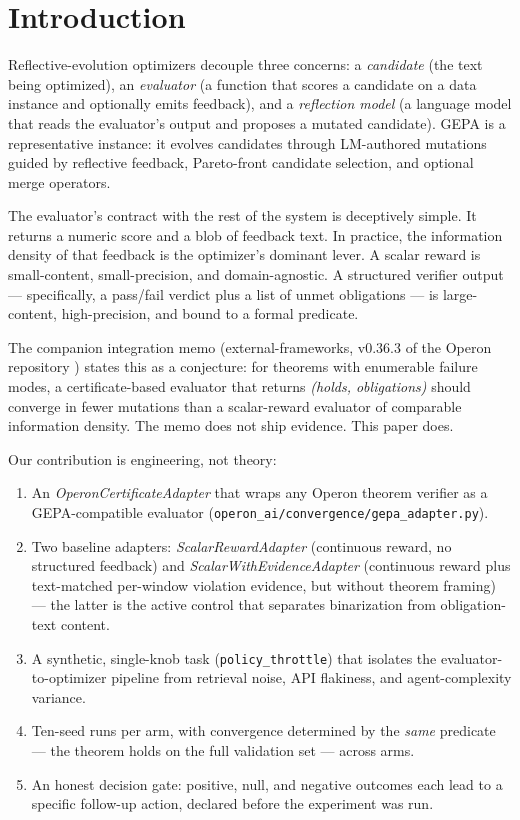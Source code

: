 \section{Introduction}\label{sec:intro}

Reflective-evolution optimizers decouple three concerns: a
\emph{candidate} (the text being optimized), an \emph{evaluator} (a
function that scores a candidate on a data instance and optionally
emits feedback), and a \emph{reflection model} (a language model that
reads the evaluator's output and proposes a mutated candidate).  GEPA
\cite{agrawal2025gepa} is a representative instance: it evolves
candidates through LM-authored mutations guided by reflective
feedback, Pareto-front candidate selection, and optional merge
operators.

The evaluator's contract with the rest of the system is deceptively
simple.  It returns a numeric score and a blob of feedback text.  In
practice, the information density of that feedback is the
optimizer's dominant lever.  A scalar reward is small-content,
small-precision, and domain-agnostic.  A structured verifier output
--- specifically, a pass/fail verdict plus a list of unmet
obligations --- is large-content, high-precision, and bound to a
formal predicate.

The companion integration memo (external-frameworks, v0.36.3 of the
Operon repository \cite{banu2026operon}) states this as a conjecture: for
theorems with enumerable failure modes, a certificate-based evaluator
that returns \emph{(holds, obligations)} should converge in fewer
mutations than a scalar-reward evaluator of comparable information
density.  The memo does not ship evidence.  This paper does.

Our contribution is engineering, not theory:

\begin{enumerate}[leftmargin=*,itemsep=2pt,topsep=2pt]
\item An \emph{OperonCertificateAdapter} that wraps any Operon
theorem verifier as a GEPA-compatible evaluator
(\texttt{operon\_ai/convergence/gepa\_adapter.py}).
\item Two baseline adapters:
\emph{ScalarRewardAdapter} (continuous reward, no structured
feedback) and \emph{ScalarWithEvidenceAdapter} (continuous reward
plus text-matched per-window violation evidence, but without theorem
framing) --- the latter is the active control that separates
binarization from obligation-text content.
\item A synthetic, single-knob task
(\texttt{policy\_throttle}) that isolates the evaluator-to-optimizer
pipeline from retrieval noise, API flakiness, and
agent-complexity variance.
\item Ten-seed runs per arm, with convergence determined by the
\emph{same} predicate --- the theorem holds on the full validation
set --- across arms.
\item An honest decision gate: positive, null, and negative
outcomes each lead to a specific follow-up action, declared before
the experiment was run.
\end{enumerate}

